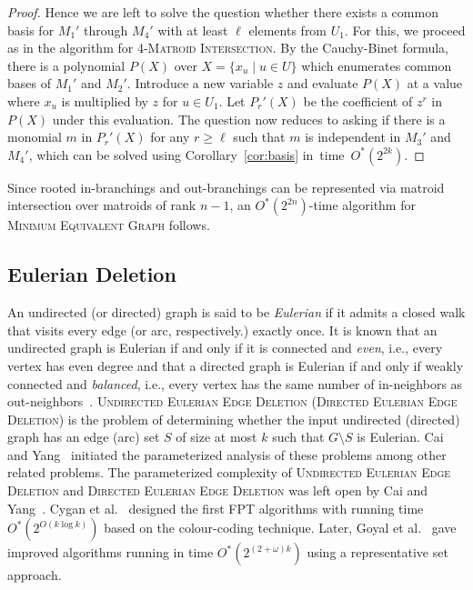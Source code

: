 \documentclass{theoretics}
\begin{document}
\begin{proof}
  Hence we are left to solve the question whether there exists
  a common basis for $M_1'$ through $M_4'$ with at least $\ell$
  elements from $U_1$. For this, we proceed as in the algorithm for
  \textsc{4-Matroid Intersection}. By the Cauchy-Binet formula,
  there is a polynomial $P(X)$ over $X=\{x_u \mid u \in U\}$
  which enumerates common bases of $M_1'$ and $M_2'$.
  Introduce a new variable $z$ and 
  evaluate $P(X)$ at a value where $x_u$ is multiplied by $z$ for $u \in U_1$. 
  Let $P_r'(X)$ be the coefficient of $z^r$ in $P(X)$ under this evaluation. 
  The question now reduces to asking if there is a monomial $m$ in
  $P_r'(X)$ for any $r \geq \ell$ such that $m$ is independent in
  $M_3'$ and $M_4'$, which can be solved using Corollary~\ref{cor:basis}
  in~time~$O^*(2^{2k})$. 
\end{proof}

Since rooted in-branchings and out-branchings can be represented via matroid intersection over matroids of rank $n-1$, an $O^*(2^{2n})$-time algorithm for \textsc{Minimum Equivalent Graph} follows.

\subsection{Eulerian Deletion}

An undirected (or directed) graph is said to be \emph{Eulerian} if it admits a closed walk that visits every edge (or arc, respectively.) exactly once.
It is known that an undirected graph is Eulerian if and only if it is connected and \emph{even}, i.e., every vertex has even degree and that a directed graph is Eulerian if and only if weakly connected and \emph{balanced}, i.e., every vertex has the same number of in-neighbors as out-neighbors~\cite{book-digraphs}.
\textsc{Undirected Eulerian Edge Deletion} (\textsc{Directed Eulerian Edge Deletion}) is the problem of determining whether the input undirected (directed) graph has an edge (arc) set $S$ of size at most $k$ such that $G \setminus S$ is Eulerian.
Cai and Yang~\cite{CaiY11} initiated the parameterized analysis of these problems among other related problems.
The parameterized complexity of \textsc{Undirected Eulerian Edge Deletion} and \textsc{Directed Eulerian Edge Deletion} was left open by Cai and Yang~\cite{CaiY11}.
Cygan et al.~\cite{CyganMPPS14euler} designed the first FPT algorithms with running time $O^*(2^{O(k \log k)})$ based on the colour-coding technique.
Later, Goyal et al.~\cite{GoyalMPPS18even} gave improved algorithms running in time $O^*(2^{(2 + \omega)k})$ using a representative set approach.
\end{document}
